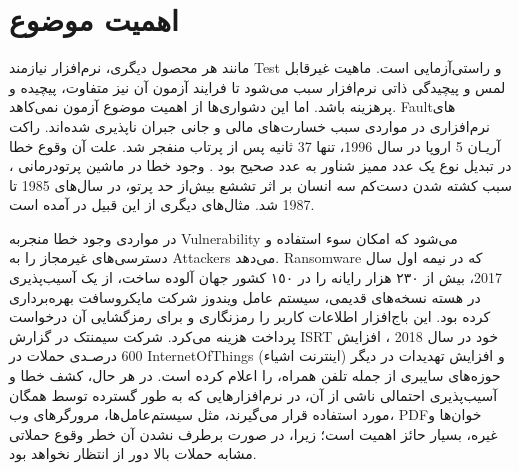 \section{اهمیت موضوع}
مانند هر محصول دیگری، نرم‌افزار نیازمند \gls{Test} و راستی‌آزمایی است.  ماهیت غیرقابل لمس و پیچیدگی ذاتی نرم‌افزار سبب می‌شود تا فرایند آزمون آن نیز متفاوت، پیچیده و پرهزینه باشد. اما این دشواری‌ها از اهمیت موضوع آزمون نمی‌کاهد. \gls{Fault}های نرم‌افزاری در مواردی سبب خسارت‌های مالی و جانی جبران ناپذیری شده‌اند. راکت آریـان 5
 اروپا در سال 1996، تنها 37 ثانیه پس از پرتاب منفجر شد. علت آن وقوع خطا در تبدیل نوع یک عدد ممیز شناور به عدد صحیح بود \cite{ammann2016introduction}. وجود خطا در ماشین پرتودرمانی ،
سبب کشته شدن دست‌کم سه انسان بر اثر تششع بیش‌از حد پرتو، در سال‌های 1985 تا 1987 شد. مثال‌های دیگری از این قبیل در 
\cite{ammann2016introduction,Dubrova:2013:FD:2462571}
آمده است.

در مواردی وجود خطا منجربه \gls{Vulnerability} می‌شود که امکان سوء استفاده و دسترسی‌های غیرمجاز را به \glspl{Attacker} می‌دهد. \gls{Ransomware} 
که در نیمه اول سال 2017، بیش از ۲۳۰ هزار رایانه را در ١٥٠ کشور جهان آلوده ساخت، از یک آسیب‌پذیری در هسته نسخه‌های قدیمی، سیستم عامل ویندوز شرکت مایکروسافت بهره‌برداری کرده ‌بود. این باج‌افزار اطلاعات کاربر را رمزنگاری و برای رمزگشایی آن درخواست پرداخت هزینه می‌کرد. شرکت سیمنتک
در گزارش \gls{ISRT} خود در سال 2018 \cite{Symantec2018}، افزایش 600 درصـدی حملات در \gls{InternetOfThings} (اینترنت اشیاء) و افزایش تهدیدات در دیگر حوزه‌های سایبری از جمله تلفن همراه، را اعلام کرده است. در هر حال، کشف خطا و آسیب‌پذیری احتمالی ناشی از آن، در نرم‌‌افزارهایی که به طور گسترده توسط همگان مورد استفاده قرار می‌گیرند، مثل سیستم‌عامل‌ها، مرورگرهای وب، \gls{PDF}خوان‌ها و غیره، بسیار حائز اهمیت است؛ زیرا، در صورت برطرف نشدن آن خطر وقوع حملاتی مشابه حملات بالا دور از انتظار نخواهد بود.


